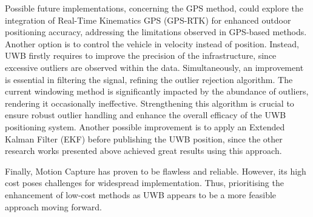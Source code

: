 \documentclass[journal]{IEEEtran}
\begin{document}
Possible future implementations, concerning the GPS method, could explore the integration of Real-Time Kinematics GPS (GPS-RTK) for enhanced outdoor positioning accuracy, addressing the limitations observed in GPS-based methods. Another option is to control the vehicle in velocity instead of position. 
Instead, UWB firstly requires to improve the precision of the infrastructure, since excessive outliers are observed within the data. Simultaneously, an improvement is essential in filtering the signal, refining the outlier rejection algorithm. The current windowing method is significantly impacted by the abundance of outliers, rendering it occasionally ineffective. Strengthening this algorithm is crucial to ensure robust outlier handling and enhance the overall efficacy of the UWB positioning system. Another possible improvement is to apply an Extended Kalman Filter (EKF) before publishing the UWB position, since the other research works presented above achieved great results using this approach.

Finally, Motion Capture has proven to be flawless and reliable. However, its high cost poses challenges for widespread implementation. Thus, prioritising the enhancement of low-cost methods as UWB appears to be a more feasible approach moving forward.

\ifCLASSOPTIONcaptionsoff
  \newpage
\fi



\end{document}
